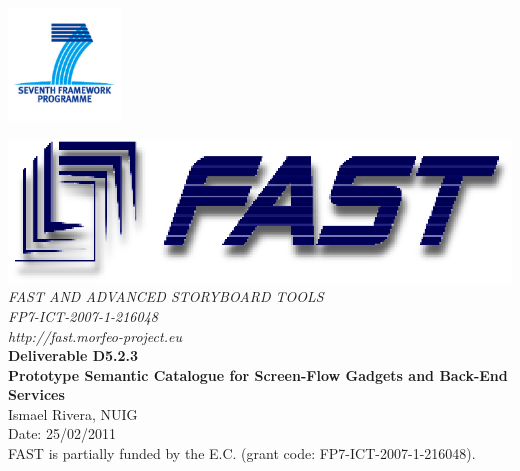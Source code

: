 \documentclass{fast_latex}
\newcommand\deliverableNumber{D5.2.3}
\newcommand\deliverableTitle{Prototype Semantic Catalogue for Screen-Flow Gadgets and Back-End Services}
\newcommand\authorOne{Ismael Rivera, NUIG}
\begin{document}

\def\note#1{\marginpar{\footnotesize#1}} %


\newenvironment{definition}{}{}

\thispagestyle{empty}


\begin{flushright}
	\includegraphics[width=3cm]{images/FP7_logo}
\end{flushright}

\vspace{1cm}

	\begin{center}
		\includegraphics{images/FAST_logo}\\
		\vspace{1cm}
		{\LARGE{\sffamily \emph{FAST AND ADVANCED STORYBOARD TOOLS}}}\\
		\vspace{0.5cm}
		{\LARGE \sffamily \emph{FP7-ICT-2007-1-216048}}\\
		\vspace{0.5cm}
		{\LARGE \sffamily \emph{http://fast.morfeo-project.eu}}\\
		\vspace{4cm}
		{\LARGE \sffamily \textbf{Deliverable \deliverableNumber}}\\
		\vspace{0.5cm}
		{\LARGE \sffamily \textbf{\deliverableTitle}}\\
		\vspace{2cm}
		{\large \sffamily \authorOne}\\
		\vspace{0.5cm}
		\vfill
		{\large \sffamily Date: 25/02/2011}\\
		\vspace{1cm}
		{\sffamily FAST is partially funded by the E.C. (grant code: FP7-ICT-2007-1-216048).}
		
	\end{center}
\end{document}
